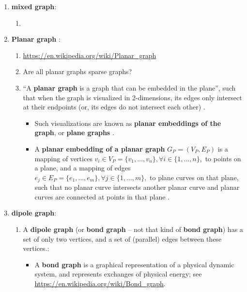 \begin{enumerate}
\begin{enumerate}
\begin{enumerate}
		\end{enumerate}
	\item {\bf mixed graph}: \vspace{-0.2cm}
		\begin{enumerate} \itemsep -2pt
		\item 
		\end{enumerate}
	\item {\bf Planar graph} \cite{WikipediaContributors2018a43}: %
		\begin{enumerate} %
		\item \url{https://en.wikipedia.org/wiki/Planar_graph}
		\item Are all planar graphs sparse graphs? \cite{WikipediaContributors2018a43}
		\item ``A {\bf planar graph} is a graph that can be embedded in the plane'', such that when the graph is visualized in 2-dimensions, its edges only intersect at their endpoints (or, its edges do not intersect each other) \cite{WikipediaContributors2018a43}.
			\begin{itemize}
			\item Such visualizations are known as {\bf planar embeddings of the graph}, or {\bf plane graphs} \cite{WikipediaContributors2018a43}.
			\item A {\bf planar embedding of a planar graph} $G_{P} = (V_{P}, E_{P})$ is a mapping of vertices $v_{i} \in V_{P} = \{v_{1}, \dots, v_{n}\}, \forall i \in \{1, \dots, n\},$ to points on a plane, and a mapping of edges $e_{j} \in E_{P} = \{e_{1}, \dots, e_{m}\}, \forall j \in \{1, \dots, m\},$ to plane curves on that plane, such that no planar curve intersects another planar curve and planar curves are connected at points in that plane \cite{WikipediaContributors2018a43}.
			\end{itemize}
		\end{enumerate}
	\item {\bf dipole graph}: \vspace{-0.2cm}
		\begin{enumerate} \itemsep -2pt
		\item A {\bf dipole graph} (or {\bf bond graph} -- not that kind of {\bf bond graph}) has a set of only two vertices, and a set of (parallel) edges between these vertices.: \vspace{-0.1cm}
			\begin{itemize} \itemsep -1pt
			\item A {\bf bond graph} is a graphical representation of a physical dynamic system, and represents exchanges of physical energy; see \url{https://en.wikipedia.org/wiki/Bond_graph}.

\end{itemize}
\end{enumerate}
\end{enumerate}
\end{enumerate}
